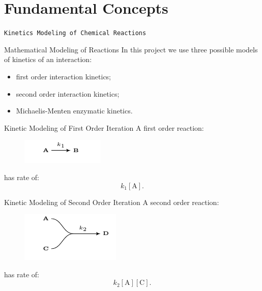 \documentclass{beamer}
\begin{document}
\section{Fundamental Concepts}

\begin{frame}{}
\begin{center}
\texttt{Kinetics Modeling of Chemical Reactions}
\end{center}
\end{frame}

\begin{frame}{Mathematical Modeling of Reactions}
In this project we use three possible models of kinetics of an 
interaction:
\begin{itemize}
\pause
\item{first order interaction kinetics;}
\pause
\item{second order interaction kinetics;}
\pause
\item{Michaelis-Menten enzymatic kinetics.}
\end{itemize}
\end{frame}


\begin{frame}{Kinetic Modeling of First Order Iteration}
A first order reaction:
\begin{figure}
\includegraphics[scale=1.5]{fundamental_concepts/first_order_reaction.pdf}
\end{figure}
\pause
has rate of:
\begin{equation*}
k_1[\text{A}].
\end{equation*}
\end{frame}

\begin{frame}{Kinetic Modeling of Second Order Iteration}
A second order reaction:
\begin{figure}
\includegraphics[scale=1.5]{fundamental_concepts/second_order_reaction.pdf}
\end{figure}
\pause
has rate of:
\begin{equation*}
    k_2[\text{A}][\text{C}].
\end{equation*}
\end{frame}
\end{document}
